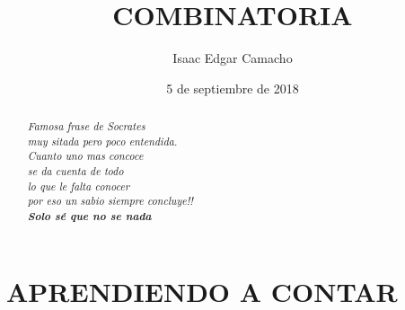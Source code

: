 \documentclass[a4paper,12pt]{article}
\title{COMBINATORIA}
\author{Isaac Edgar Camacho}
\date{5 de septiembre de 2018}
\begin{document}
\maketitle

\begin{abstract}
\begin{flushright}
\textit{
Famosa frase de Socrates \\muy sitada pero poco entendida.
\\Cuanto uno mas concoce \\se da cuenta de todo\\ lo que le falta conocer\\ por eso un sabio siempre concluye!!\\
\textbf{Solo sé que no se nada} 
}
\end{flushright}

\end{abstract}


\section{APRENDIENDO A CONTAR}
\end{document}
